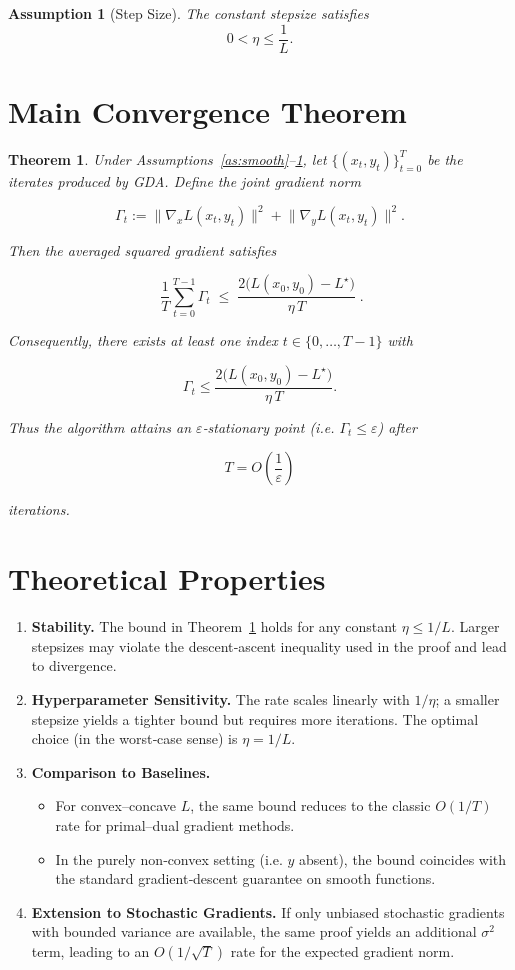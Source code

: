 \documentclass{article}
\newtheorem{theorem}{Theorem}
\newtheorem{assumption}{Assumption}
\newcommand{\grad}{\nabla}
\begin{document}
\begin{assumption}[Step Size]\label{as:stepsize}
The constant stepsize satisfies 
\[
0<\eta\le \frac{1}{L}.
\]
\end{assumption}

\section*{Main Convergence Theorem}
\begin{theorem}\label{thm:main}
Under Assumptions~\ref{as:smooth}–\ref{as:stepsize}, let $\{(x_t,y_t)\}_{t=0}^{T}$ be the iterates produced by GDA.  Define the joint gradient norm  

\[
\Gamma_t:=\big\|\grad_{x}L(x_t,y_t)\big\|^{2}
+\big\|\grad_{y}L(x_t,y_t)\big\|^{2}.
\]

Then the averaged squared gradient satisfies  

\[
\boxed{\;
\frac{1}{T}\sum_{t=0}^{T-1}\Gamma_t
\;\le\;
\frac{2\big(L(x_0,y_0)-L^\star\big)}{\eta\,T}\; } .
\]

Consequently, there exists at least one index $t\in\{0,\dots,T-1\}$ with  

\[
\Gamma_t\le \frac{2\big(L(x_0,y_0)-L^\star\big)}{\eta\,T}.
\]

Thus the algorithm attains an $\varepsilon$‑stationary point (i.e. $\Gamma_t\le\varepsilon$) after  

\[
T = O\!\left(\frac{1}{\varepsilon}\right)
\]

iterations.
\end{theorem}

\section*{Theoretical Properties}
\begin{enumerate}[leftmargin=*]
\item \textbf{Stability.} The bound in Theorem~\ref{thm:main} holds for any constant $\eta\le 1/L$.  Larger stepsizes may violate the descent‑ascent inequality used in the proof and lead to divergence.
\item \textbf{Hyperparameter Sensitivity.} The rate scales linearly with $1/\eta$; a smaller stepsize yields a tighter bound but requires more iterations.  The optimal choice (in the worst‑case sense) is $\eta=1/L$.
\item \textbf{Comparison to Baselines.}
    \begin{itemize}
        \item For convex–concave $L$, the same bound reduces to the classic $O(1/T)$ rate for primal–dual gradient methods.
        \item In the purely non‑convex setting (i.e. $y$ absent), the bound coincides with the standard gradient‑descent guarantee on smooth functions.
    \end{itemize}
\item \textbf{Extension to Stochastic Gradients.} If only unbiased stochastic gradients with bounded variance are available, the same proof yields an additional $\sigma^2$ term, leading to an $O(1/\sqrt{T})$ rate for the expected gradient norm.
\end{enumerate}
\end{document}
